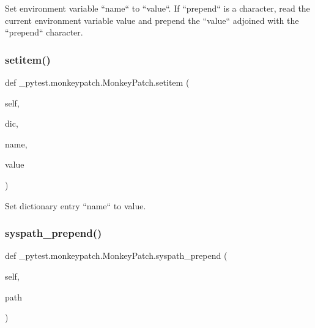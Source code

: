 \begin{DoxyVerb}Set environment variable ``name`` to ``value``.  If ``prepend``
is a character, read the current environment variable value
and prepend the ``value`` adjoined with the ``prepend`` character.\end{DoxyVerb}
 \mbox{\label{class__pytest_1_1monkeypatch_1_1_monkey_patch_a188f5623428b6b29b94e5144bc2d75b3}} 
\subsubsection{\texorpdfstring{setitem()}{setitem()}}
{\footnotesize\ttfamily def \+\_\+pytest.\+monkeypatch.\+Monkey\+Patch.\+setitem (\begin{DoxyParamCaption}\item[{}]{self,  }\item[{}]{dic,  }\item[{}]{name,  }\item[{}]{value }\end{DoxyParamCaption})}

\begin{DoxyVerb}Set dictionary entry ``name`` to value. \end{DoxyVerb}
 \mbox{\label{class__pytest_1_1monkeypatch_1_1_monkey_patch_a0f6b909b0c6dfd6873488c43feb22bd5}} 
\subsubsection{\texorpdfstring{syspath\+\_\+prepend()}{syspath\_prepend()}}
{\footnotesize\ttfamily def \+\_\+pytest.\+monkeypatch.\+Monkey\+Patch.\+syspath\+\_\+prepend (\begin{DoxyParamCaption}\item[{}]{self,  }\item[{}]{path }\end{DoxyParamCaption})}

